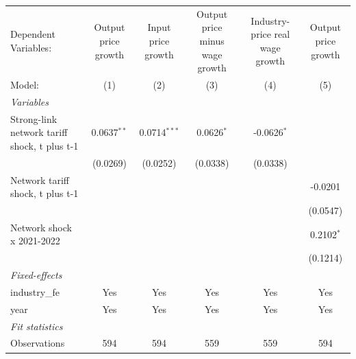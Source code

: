 \begingroup
\centering
\begin{tabular}{lccccc}
   \tabularnewline \midrule \midrule
   Dependent Variables:                         & Output price growth & Input price growth & Output price minus wage growth & Industry-price real wage growth & Output price growth\\  
   Model:                                       & (1)                 & (2)                & (3)                            & (4)                             & (5)\\  
   \midrule
   \emph{Variables}\\
   Strong-link network tariff shock, t plus t-1 & 0.0637$^{**}$       & 0.0714$^{***}$     & 0.0626$^{*}$                   & -0.0626$^{*}$                   &   \\   
                                                & (0.0269)            & (0.0252)           & (0.0338)                       & (0.0338)                        &   \\   
   Network tariff shock, t plus t-1             &                     &                    &                                &                                 & -0.0201\\   
                                                &                     &                    &                                &                                 & (0.0547)\\   
   Network shock x 2021-2022                    &                     &                    &                                &                                 & 0.2102$^{*}$\\   
                                                &                     &                    &                                &                                 & (0.1214)\\   
   \midrule
   \emph{Fixed-effects}\\
   industry\_fe                                 & Yes                 & Yes                & Yes                            & Yes                             & Yes\\  
   year                                         & Yes                 & Yes                & Yes                            & Yes                             & Yes\\  
   \midrule
   \emph{Fit statistics}\\
   Observations                                 & 594                 & 594                & 559                            & 559                             & 594\\  

\end{tabular}
